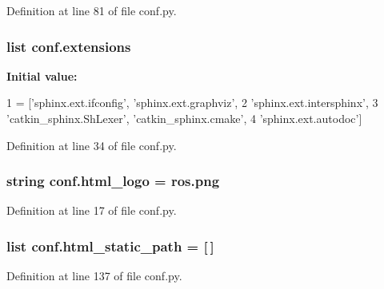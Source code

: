 Definition at line 81 of file conf.\+py.

\subsubsection[{\texorpdfstring{extensions}{extensions}}]{\setlength{\rightskip}{0pt plus 5cm}list conf.\+extensions}\hypertarget{namespaceconf_ae475e080536acb271a0a0efe56c3ba42}{}\label{namespaceconf_ae475e080536acb271a0a0efe56c3ba42}
{\bfseries Initial value\+:}
\begin{DoxyCode}
1 = [\textcolor{stringliteral}{'sphinx.ext.ifconfig'}, \textcolor{stringliteral}{'sphinx.ext.graphviz'},
2               \textcolor{stringliteral}{'sphinx.ext.intersphinx'}, 
3               \textcolor{stringliteral}{'catkin\_sphinx.ShLexer'}, \textcolor{stringliteral}{'catkin\_sphinx.cmake'},
4               \textcolor{stringliteral}{'sphinx.ext.autodoc'}]
\end{DoxyCode}


Definition at line 34 of file conf.\+py.

\subsubsection[{\texorpdfstring{html\+\_\+logo}{html_logo}}]{\setlength{\rightskip}{0pt plus 5cm}string conf.\+html\+\_\+logo = \textquotesingle{}ros.\+png\textquotesingle{}}\hypertarget{namespaceconf_a85ebd472b7d3a9e41a63030cdd5944e6}{}\label{namespaceconf_a85ebd472b7d3a9e41a63030cdd5944e6}


Definition at line 17 of file conf.\+py.

\subsubsection[{\texorpdfstring{html\+\_\+static\+\_\+path}{html_static_path}}]{\setlength{\rightskip}{0pt plus 5cm}list conf.\+html\+\_\+static\+\_\+path = \mbox{[}$\,$\mbox{]}}\hypertarget{namespaceconf_af4fb5d8851ccaade135c2668dd3ced41}{}\label{namespaceconf_af4fb5d8851ccaade135c2668dd3ced41}


Definition at line 137 of file conf.\+py.

